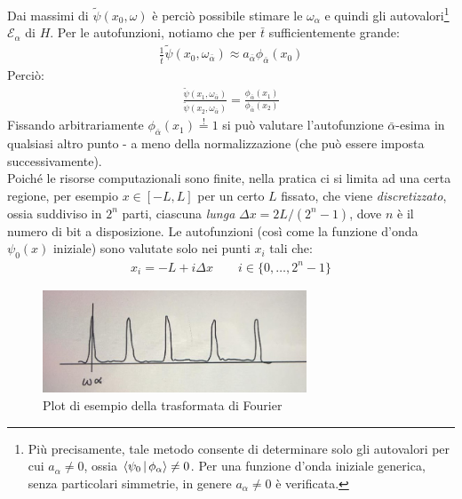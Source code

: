\documentclass[../../InformazioneQuantistica.tex]{subfiles}
\begin{document}
Dai massimi di $\tilde\psi(x_0, \omega)$ è perciò possibile stimare le $\omega_\alpha$ e quindi gli autovalori\footnote{Più precisamente, tale metodo consente di determinare solo gli autovalori per cui $a_\alpha \neq 0$, ossia $\Braket{\psi_0|\phi_\alpha} \neq 0$. Per una funzione d'onda iniziale generica, senza particolari simmetrie, in genere $a_\alpha \neq 0$ è verificata.} $\mathcal{E}_\alpha$ di $H$. Per le autofunzioni, notiamo che per $\bar{t}$ sufficientemente grande:
\begin{align*}
    \frac{1}{\bar{t}} \tilde{\psi}(x_0, \omega_{\bar{\alpha}}) \approx a_{\bar{\alpha}} \phi_{\bar{\alpha}}(x_0)
\end{align*}
Perciò:
\begin{align*}
    \frac{\tilde{\psi}(x_1, \omega_{\bar{\alpha}})}
    {\tilde{\psi}(x_2, \omega_{\bar{\alpha}})} = 
    \frac{\phi_{\bar{\alpha}}(x_1)}{\phi_{\bar{\alpha}}(x_2)}
\end{align*}
Fissando arbitrariamente $\phi_{\bar{\alpha}}(x_1) \overset{!}{=} 1$ si può valutare l'autofunzione $\bar{\alpha}$-esima in qualsiasi altro punto - a meno della normalizzazione (che può essere imposta successivamente).\\ 
Poiché le risorse computazionali sono finite, nella pratica ci si limita ad una certa regione, per esempio $x\in [-L,L]$ per un certo $L$ fissato, che viene \textit{discretizzato}, ossia suddiviso in $2^n$ parti, ciascuna \textit{lunga} $\Delta x = 2L/(2^n-1)$, dove $n$ è il numero di bit a disposizione. Le autofunzioni (così come la funzione d'onda $\psi_0(x)$ iniziale) sono valutate solo nei punti $x_i$ tali che:
\begin{align*}
    x_i = -L + i\Delta x \qquad i\in \{0, \dots, 2^{n}-1\}
\end{align*}

\begin{figure}[H]
\centering
\includegraphics[width=0.7\textwidth]{Immagini/6_6/Fourier.jpg}
\caption{Plot di esempio della trasformata di Fourier\label{fig:Fourier-transform-ex}}
\end{figure}
\end{document}
